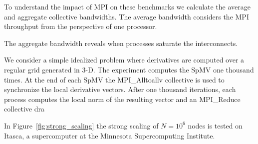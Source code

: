\documentclass{report}
\begin{document}
To understand the impact of MPI on these benchmarks we calculate the average and aggregate collective bandwidths. The average bandwidth considers the MPI throughput from the perspective of one processor. 

The aggregate bandwidth reveals when processes saturate the interconnects. 

We consider a simple idealized problem where derivatives are computed over a regular grid generated in 3-D. The experiment computes the SpMV one thousand times. At the end of each SpMV the MPI\_Alltoallv collective is used to synchronize the local derivative vectors. After one thousand iterations, each process computes the local norm of the resulting vector and an MPI\_Reduce collective dra

In Figure~\ref{fig:strong_scaling} the strong scaling of $N=10^6$ nodes is tested on Itasca, a supercomputer at the Minnesota Supercomputing Institute.   
\end{document}

